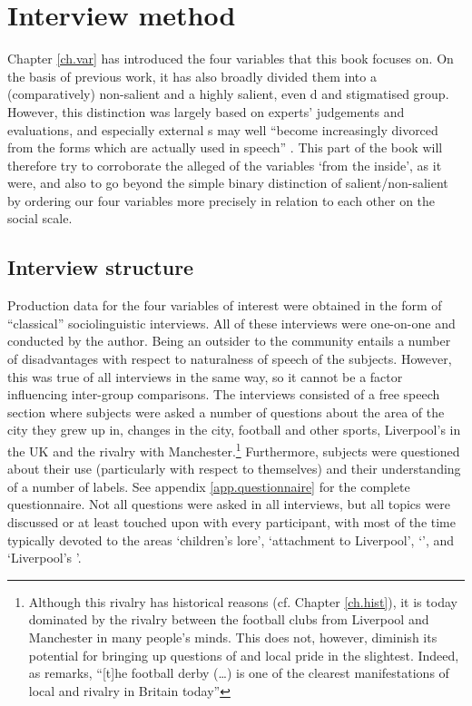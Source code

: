 \chapter{Interview method}\label{ch.prod_method}

Chapter \ref{ch.var} has introduced the four variables that this book focuses on.
On the basis of previous work, it has also broadly divided them into a (comparatively) non-salient and a highly salient, even d and stigmatised group.
However, this distinction was largely based on experts' judgements and evaluations, and especially external s may well ``become increasingly divorced from the forms which are actually used in speech'' \parencite[180]{labov1972}.
This part of the book will therefore try to corroborate the alleged  of the variables `from the inside', as it were, and also to go beyond the simple binary distinction of salient/non-salient by ordering our four variables more precisely in relation to each other on the social  scale.

	\section{Interview structure}\label{sec.prod_method.interview}
	
Production data for the four variables of interest were obtained in the form of ``classical'' sociolinguistic interviews.
All of these interviews were one-on-one and conducted by the author.
Being an outsider to the community entails a number of disadvantages with respect to naturalness of speech of the subjects.
However, this was true of all interviews in the same way, so it cannot be a factor influencing inter-group comparisons.
The interviews consisted of a free speech section where subjects were asked a number of questions about the area of the city they grew up in, changes in the city, football and other sports, Liverpool's  in the UK and the rivalry with Manchester.\footnote{Although this rivalry has historical reasons (cf. Chapter \ref{ch.hist}), it is today dominated by the rivalry between the football clubs from Liverpool and Manchester in many people's minds. This does not, however, diminish its potential for bringing up questions of  and local pride in the slightest. Indeed, as \textcite[97]{beal2010} remarks, ``[t]he football derby (\dots) is one of the clearest manifestations of local  and rivalry in Britain today''}
Furthermore, subjects were questioned about their use (particularly with respect to themselves) and their understanding of a number of  labels.
See appendix \ref{app.questionnaire} for the complete questionnaire.
Not all questions were asked in all interviews, but all topics were discussed or at least touched upon with every participant, with most of the time typically devoted to the areas `children's lore', `attachment to Liverpool', `', and `Liverpool's '.

